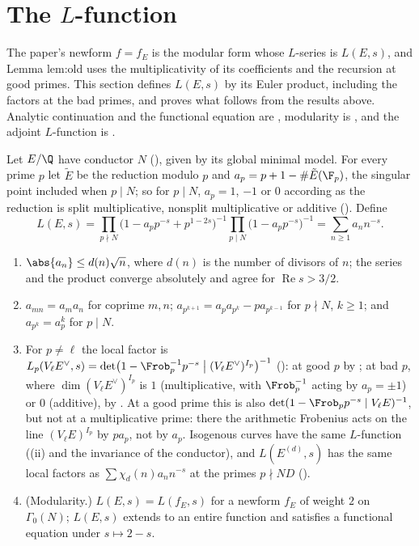 \section{The \texorpdfstring{$L$}{L}-function}\label{sec:ellcurves:Lfunction}

The paper's newform $f=f_E$ is the modular form whose $L$-series is $L(E,s)$, and Lemma lem:old uses the multiplicativity of its coefficients and the recursion at good primes. This section defines
$L(E,s)$ by its Euler product, including the factors at the bad primes, and proves what follows from the results above. Analytic continuation and the functional equation are
, modularity is , and the adjoint $L$-function is .

\begin{definition}\label{def:ellcurves:Lfunction}
Let $E/\Q$ have conductor $N$ (), given by its global minimal model. For every prime $p$ let $\tilde E$ be the reduction modulo $p$ and $a_p=p+1-\#\tilde E(\F_p)$, the singular point
included when $p\mid N$; so for $p\mid N$, $a_p=1$, $-1$ or $0$ according as the reduction is split multiplicative, nonsplit multiplicative or additive (). Define
\[
L(E,s)=\prod_{p\nmid N}\bigl(1-a_pp^{-s}+p^{1-2s}\bigr)^{-1}\prod_{p\mid N}\bigl(1-a_pp^{-s}\bigr)^{-1}=\sum_{n\ge1}a_nn^{-s}.
\]
\end{definition}

\begin{proposition}[properties of $L(E,s)$]\label{prop:ellcurves:Lfunction}
\leavevmode
\begin{enumerate}[label=(\roman*)]
\item $\abs{a_n}\le d(n)\sqrt n$, where $d(n)$ is the number of divisors of $n$; the series and the product converge absolutely and agree for $\operatorname{Re}s>3/2$.
\item $a_{mn}=a_ma_n$ for coprime $m,n$; $a_{p^{k+1}}=a_pa_{p^k}-pa_{p^{k-1}}$ for $p\nmid N$, $k\ge1$; and $a_{p^k}=a_p^k$ for $p\mid N$.
\item For $p\ne\ell$ the local factor is $L_p(V_\ell E^\vee,s)=\det\bigl(1-\Frob_p^{-1}p^{-s}\bigm|(V_\ell E^\vee)^{I_p}\bigr)^{-1}$ (): at good $p$ by
; at bad $p$, where $\dim(V_\ell E^\vee)^{I_p}$ is $1$ (multiplicative, with $\Frob_p^{-1}$ acting by $a_p=\pm1$) or $0$ (additive), by . At a
good prime this is also $\det(1-\Frob_pp^{-s}\mid V_\ell E)^{-1}$, but not at a multiplicative prime: there the arithmetic Frobenius acts on the line $(V_\ell E)^{I_p}$ by $pa_p$, not by $a_p$. Isogenous curves have the same $L$-function
((ii) and the invariance of the conductor), and $L(E^{(d)},s)$ has the same local factors as $\sum\chi_d(n)a_nn^{-s}$ at the primes $p\nmid ND$
().
\item (Modularity.) $L(E,s)=L(f_E,s)$ for a newform $f_E$ of weight $2$ on $\Gamma_0(N)$; $L(E,s)$ extends to an entire function and satisfies a functional equation under $s\mapsto2-s$.
\end{enumerate}
\end{proposition}

